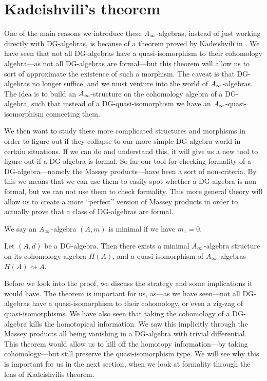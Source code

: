 

\section{Kadeishvili's theorem}

One of the main reasons we introduce these $A_{\infty}$-algebras, instead of just working directly with DG-algebras, is because of a theorem proved by Kadeishvili in \cite{kadeishvili}. We have seen that not all DG-algebras have a quasi-isomorphism to their cohomology algebra---as not all DG-algebras are formal---but this theorem will allow us to sort of approximate the existence of such a morphism. The caveat is that DG-algebras no longer suffice, and we must venture into the world of $A_{\infty}$-algebras. The idea is to build an $A_{\infty}$-structure on the cohomology algebra of a DG-algebra, such that instead of a DG-quasi-isomorphism we have an $A_{\infty}$-quasi-isomorphism connecting them. 

We then want to study these more complicated structures and morphisms in order to figure out if they collapse to our more simple DG-algebra world in certain situations. If we can do and understand this, it will give us a new tool to figure out if a DG-algebra is formal. So far our tool for checking formality of a DG-algebra---namely the Massey products---have been a sort of non-criteria. By this we means that we can use them to easily spot whether a DG-algebra is non-formal, but we can not use them to check formality. This more general theory will allow us to create a more ``perfect'' version of Massey products in order to actually prove that a class of DG-algebras are formal. 

\begin{definition}
\label{def:minimal_A_infinity-algebra}
We say an $A_{\infty}$-algebra $(A, m)$ is minimal if we have $m_1 = 0$. 
\end{definition}

\begin{theorem}
\label{thm:Kadeishvilis_theorem}
Let $(A,d)$ be a DG-algebra. Then there exists a minimal $A_{\infty}$-algebra structure on its cohomology algebra $H(A)$, and a quasi-isomorphism of $A_{\infty}$-algebras $H(A)\rightsquigarrow A$. 
\end{theorem}

Before we look into the proof, we discuss the strategy and some implications it would have. The theorem is important for us, as---as we have seen---not all DG-algebras have a quasi-isomorphism to their cohomology, or even a zig-zag of quasi-isomorphisms. We have also seen that taking the cohomology of a DG-algebra kills the homotopical information. We saw this implicitly through the Massey products all being vanishing in a DG-algebra with trivial differential. This theorem would allow us to kill off the homotopy information---by taking cohomology---but still preserve the quasi-isomorphism type. We will see why this is important for us in the next section, when we look at formality through the lens of Kadeishvilis theorem.

